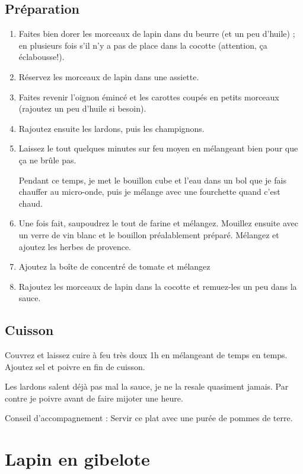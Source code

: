 \subsection*{Préparation}
\begin{enumerate}
\item Faites bien dorer les morceaux de lapin dans du beurre (et un peu d'huile) ; en plusieurs fois s'il n'y a pas de place dans la cocotte (attention, ça éclabousse!).
\item Réservez les morceaux de lapin dans une assiette.
\item Faites revenir l'oignon émincé et les carottes coupés en petits morceaux (rajoutez un peu d'huile si besoin).
\item Rajoutez ensuite les lardons, puis les champignons.
\item Laissez le tout quelques minutes sur feu moyen en mélangeant bien pour que ça ne brûle pas.
\begin{remarque}
Pendant ce temps, je met le bouillon cube et l'eau dans un bol que je fais chauffer au micro-onde, puis je mélange avec une fourchette quand c'est chaud.
\end{remarque}
\item Une fois fait, saupoudrez le tout de farine et mélangez. Mouillez ensuite avec un verre de vin blanc et le bouillon préalablement préparé. Mélangez et ajoutez les herbes de provence.
\item Ajoutez la boîte de concentré de tomate et mélangez
\item Rajoutez les morceaux de lapin dans la cocotte et remuez-les un peu dans la sauce.
\end{enumerate}

\subsection*{Cuisson}
Couvrez et laissez cuire à feu très doux 1h en mélangeant de temps en temps. Ajoutez sel et poivre en fin de cuisson.
\begin{remarque}
Les lardons salent déjà pas mal la sauce, je ne la resale quasiment jamais. Par contre je poivre avant de faire mijoter une heure.
\end{remarque}

Conseil d'accompagnement : Servir ce plat avec une purée de pommes de terre.

\newpage
\section{Lapin en gibelote}

